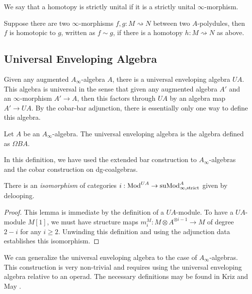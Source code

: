 \documentclass[../thesis.tex]{subfiles}
\begin{document}
            We say that a homotopy is strictly unital if it is a strictly unital $\infty$-morphism.

            \begin{definition}
                Suppose there are two $\infty$-morphisms $f,g : M \rightsquigarrow N$ between two $A$-polydules, then $f$ is homotopic to $g$, written as $f \sim g$, if there is a homotopy $h : M \rightsquigarrow N$ as above.
            \end{definition}

        \subsection{Universal Enveloping Algebra}

            Given any augmented $A_\infty$-algebra $A$, there is a universal enveloping algebra $UA$. This algebra is universal in the sense that given any augmented algebra $A'$ and an $\infty$-morphism  $A' \rightarrow A$, then this factors through $UA$ by an algebra map $A' \rightarrow UA$. By the cobar-bar adjunction, there is essentially only one way to define this algebra.

            \begin{definition}
                Let $A$ be an $A_\infty$-algebra. The universal enveloping algebra is the algebra defined as $\Omega BA$.
            \end{definition}
            \begin{remark}
                In this definition, we have used the extended bar construction to $A_\infty$-algebras and the cobar construction on dg-coalgebras.
            \end{remark}

            \begin{lemma}\label{lem: Polydules-are-modules}
                There is an \textit{isomorphism} of categories $i : \tt{Mod}^{UA} \rightarrow \tt{suMod}_{\infty, \tt{strict}}^{A}$ given by delooping.
            \end{lemma}
            \begin{proof}
                This lemma is immediate by the definition of a $UA$-module. To have a $UA$-module $M[1]$, we must have structure maps $m_i^M : M \otimes A^{\otimes i-1} \rightarrow M$ of degree $2-i$ for any $i \geq 2$. Unwinding this definition and using the adjunction data establishes this isomorphism.
            \end{proof}

            We can generalize the universal enveloping algebra to the case of $A_\infty$-algebras. This construction is very non-trivial and requires using the universal enveloping algebra relative to an operad. The necessary definitions may be found in Kriz and May \cite{Kriz95}.
            
\end{document}
